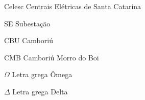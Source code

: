 \listoffigures
\cleardoublepage

\listoftables*
\cleardoublepage

\begin{siglas}
  \item[Celesc] Centrais Elétricas de Santa Catarina
  \item[SE] Subestação
  \item[CBU] Camboriú
  \item[CMB] Camboriú Morro do Boi
\end{siglas}

\begin{simbolos}
  \item[$ \Omega $] Letra grega Ômega
  \item[$ \Delta $] Letra grega Delta
\end{simbolos}

\tableofcontents*
\cleardoublepage

